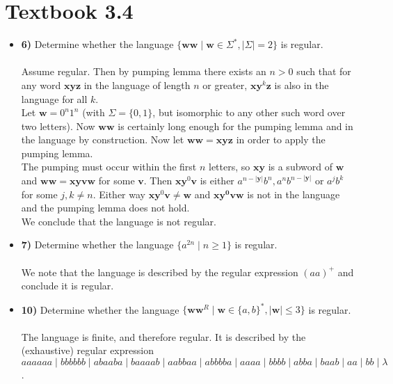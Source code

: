 \documentclass[defaultpackages]{simplereport}
\begin{document}
\section*{Textbook 3.4}
\begin{itemize}[label=]
  \item \textbf{6)} Determine whether the language $\{\mathbf{ww} \mid
    \mathbf{w} \in \Sigma^*, \lvert \Sigma \rvert = 2\}$ is regular.\\
    \\
    Assume regular. Then by pumping lemma there exists an $n > 0$ such that for
    any word $\mathbf{xyz}$ in the language of length $n$ or greater,
    $\mathbf{x}\mathbf{y}^k\mathbf{z}$ is also in the language for all $k$.\\
    Let $\mathbf{w} = 0^n1^n$ (with $\Sigma = \{0,1\}$, but isomorphic to any
    other such word over two letters). Now $\mathbf{ww}$ is certainly long
    enough for the pumping lemma and in the language by construction.
    Now let $\mathbf{ww} = \mathbf{xyz}$ in order to apply the pumping lemma.\\
    The pumping must occur within the first $n$ letters, so $\mathbf{xy}$ is a
    subword of $\mathbf{w}$ and $\mathbf{ww} = \mathbf{xyvw}$ for some $\mathbf{v}$.
    Then $\mathbf{xy}^0\mathbf{v}$ is either $a^{n-\lvert \mathbf{y} \rvert}b^n,
    a^nb^{n-\lvert \mathbf{y} \rvert}$ or $a^jb^k$ for some $j, k \neq n$.
    Either way $\mathbf{xy}^0\mathbf{v} \neq \mathbf{w}$ and $\mathbf{xy^0vw}$
    is not in the language and the pumping lemma does not hold.\\
    We conclude that the language is not regular.
  \item \textbf{7)} Determine whether the language $\{a^{2n} \mid n \geq 1\}$ is
    regular.\\\\
    We note that the language is described by the regular expression $(aa)^+$
    and conclude it is regular.
  \item \textbf{10)} Determine whether the language $\{\mathbf{ww}^R \mid
    \mathbf{w} \in \{a, b\}^*, \lvert \mathbf{w} \rvert \leq 3\}$ is
    regular.\\\\
    The language is finite, and therefore regular. It is described by the
    (exhaustive) regular expression ${aaaaaa} \mid {bbbbbb} \mid
    {abaaba} \mid {baaaab} \mid {aabbaa} \mid {abbbba} \mid {aaaa}
    \mid {bbbb} \mid {abba} \mid {baab} \mid {aa} \mid {bb} \mid \lambda$.
\end{itemize}
\end{document}
